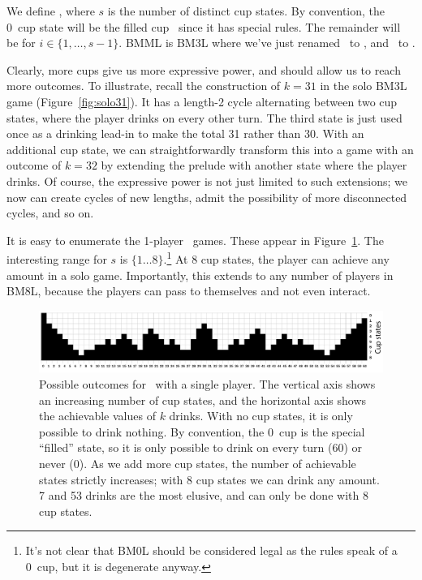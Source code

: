 \documentclass[twocolumn]{article}
\begin{document}
We define \bmsl, where $s$ is the number of distinct cup states. By
convention, the 0\th\ cup state will be the filled cup \fullcup\ since
it has special rules. The remainder will be  for $i \in \{ 1,
\ldots, s - 1 \}$. BMML is BM3L where we've just renamed \emptycup\ to
, and \overcup\ to .

Clearly, more cups give us more expressive power, and should allow us
to reach more outcomes. To illustrate, recall the construction of
$k=31$ in the solo BM3L game (Figure~\ref{fig:solo31}). It has a
length-2 cycle alternating between two cup states, where the player
drinks on every other turn. The third state is just used once as a
drinking lead-in to make the total 31 rather than 30. With an
additional cup state, we can straightforwardly transform this into a
game with an outcome of $k=32$ by extending the prelude with another
state where the player drinks. Of course, the expressive power is not
just limited to such extensions; we now can create cycles of new
lengths, admit the possibility of more disconnected cycles, and so on.

It is easy to enumerate the 1-player \bmsl\ games. These appear in
Figure~\ref{fig:soloncups}. The interesting range for $s$ is $\{ 1
\ldots 8 \}$.\!\footnote{It's not clear that BM0L should be considered
  legal as the rules speak of a 0\th\ cup, but it is degenerate
  anyway.} At 8 cup states, the player can achieve any amount in a
solo game. Importantly, this extends to any number of players in BM8L,
because the players can pass to themselves and not even interact.

\begin{figure}
\begin{center}
\includegraphics[width=\linewidth]{soloncups.pdf}
\end{center}\vspace{-0.1in}
\caption{Possible outcomes for \bmsl\ with a single player. The
  vertical axis shows an increasing number of cup states, and the
  horizontal axis shows the achievable values of $k$ drinks. With no
  cup states, it is only possible to drink nothing. By convention, the
  0\th\ cup is the special ``filled'' state, so it is only possible to
  drink on every turn (60) or never (0). As we add more cup states,
  the number of achievable states strictly increases; with 8 cup
  states we can drink any amount. 7 and 53 drinks are the most
  elusive, and can only be done with 8 cup states.}
\label{fig:soloncups}
\end{figure}
\end{document}
